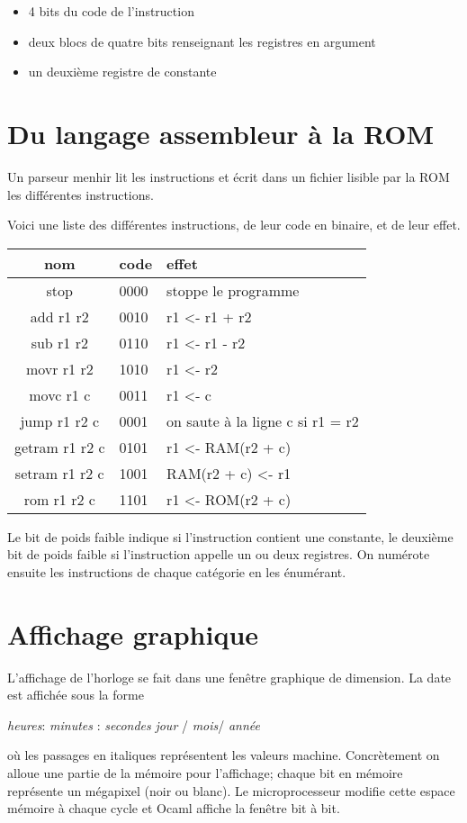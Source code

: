 \documentclass[12pt,a4paper,french]{article}
\begin{document}
\begin{itemize}
    \item 4 bits du code de l'instruction
    \item deux blocs de quatre bits renseignant les registres en argument
    \item un deuxième registre de constante
\end{itemize}


\section{Du langage assembleur à la ROM}

Un parseur menhir lit les instructions et écrit dans un fichier lisible par la ROM les différentes instructions.

Voici une liste des différentes instructions, de leur code en binaire, et de leur effet.

\;



\begin{tabularx}{15cm}{|c|p{4cm}|X|}
    \hline
    nom & code & effet \\
    \hline
    stop & 0000 & stoppe le programme \\
    \hline
    add r1 r2 & 0010 & r1 <- r1 + r2 \\
    \hline
    sub r1 r2 & 0110 & r1 <- r1 - r2 \\
    \hline
    movr r1 r2 & 1010 & r1 <- r2 \\
    \hline
    movc r1 c & 0011 & r1 <- c \\
    \hline
    jump r1 r2 c & 0001 & on saute à la ligne c si r1 = r2 \\
    \hline
    getram r1 r2 c & 0101 & r1 <- RAM(r2 + c) \\
    \hline
    setram r1 r2 c & 1001 & RAM(r2 + c) <- r1 \\
    \hline
    rom r1 r2 c & 1101 & r1 <- ROM(r2 + c) \\
    \hline
\end{tabularx}


\;


Le bit de poids faible indique si l'instruction contient une constante, le deuxième bit de poids faible si l'instruction appelle un ou deux registres.
On numérote ensuite les instructions de chaque catégorie en les énumérant. 

\section{Affichage graphique}

L'affichage de l'horloge se fait dans une fenêtre graphique de dimension. La date est affichée sous la forme 

\textit {heures}: \textit {minutes} : \textit {secondes} \textit {jour} / \textit {mois}/ \textit {année} 

où les passages en italiques représentent les valeurs machine.
Concrètement on alloue une partie de la mémoire pour l'affichage; chaque bit en mémoire représente un mégapixel (noir ou blanc). Le microprocesseur modifie cette espace mémoire à chaque cycle et Ocaml affiche la fenêtre bit à bit.
\end{document}
